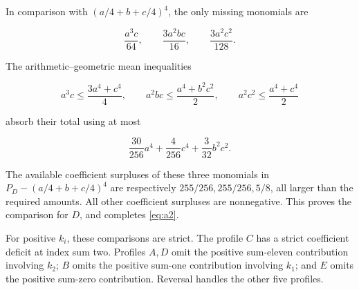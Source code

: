 In comparison with \((a/4+b+c/4)^4\), the only missing monomials are

\[
\frac{a^3c}{64},\qquad\frac{3a^2bc}{16},\qquad\frac{3a^2c^2}{128}.
\]

The arithmetic--geometric mean inequalities

\[
a^3c\le\frac{3a^4+c^4}{4},\qquad
a^2bc\le\frac{a^4+b^2c^2}{2},\qquad
a^2c^2\le\frac{a^4+c^4}{2}
\]

absorb their total using at most

\[
\frac{30}{256}a^4+\frac4{256}c^4+\frac3{32}b^2c^2.
\]

The available coefficient surpluses of these three monomials in
\(P_D-(a/4+b+c/4)^4\) are respectively
\(255/256,255/256,5/8\), all larger than the required amounts. All other
coefficient surpluses are nonnegative. This proves the comparison for \(D\),
and completes \eqref{eq:a2}.

For positive \(k_i\), these comparisons are strict. The profile \(C\) has a
strict coefficient deficit at index sum two. Profiles \(A,D\) omit the positive
sum-eleven contribution involving \(k_2\); \(B\) omits the positive sum-one
contribution involving \(k_1\); and \(E\) omits the positive sum-zero
contribution. Reversal handles the other five profiles.
